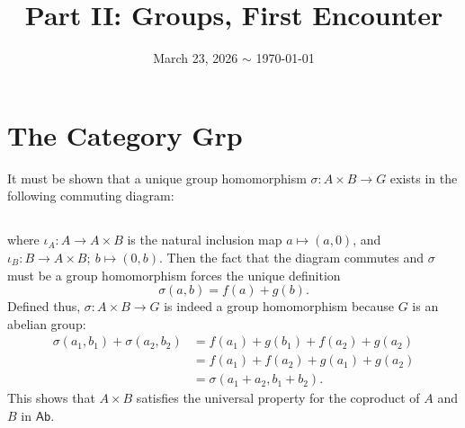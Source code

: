 \documentclass[12pt]{article}
\title{\course\ \\ Part II: Groups, First Encounter}
\author{\myname}
\date{March 23, 2026 $\sim$ \today}
\begin{document}
\maketitle
\thispagestyle{fancy}


\setcounter{section}{2}
\section{The Category Grp} 

\setcounter{subsection}{2} 
It must be shown that a unique group homomorphism $\sigma: A \times B \rightarrow G$ exists in the following commuting diagram: 
\subsection{} 
\begin{center}
\end{center}
where $\iota_{A}: A \rightarrow A \times B$ is the natural inclusion map $a \mapsto (a, 0)$, and $\iota_{B}: B \rightarrow A \times B; \: b \mapsto (0, b)$. 
Then the fact that the diagram commutes and $\sigma$ must be a group homomorphism forces the unique definition
$$\sigma(a, b) = f(a) + g(b).$$
Defined thus, $\sigma:A \times B \rightarrow G$ is indeed a group homomorphism because $G$ is an abelian group:
\begin{align*}
  \sigma(a_1, b_1) + \sigma(a_2, b_2) & = f(a_1) + g(b_1) + f(a_2) + g(a_2) \\ 
                                      & = f(a_1) + f(a_2) + g(a_1) + g(a_2) \\ 
                                      & = \sigma(a_1 + a_2, b_1 + b_2).
\end{align*}
This shows that $A \times B$ satisfies the universal property for the coproduct of $A$ and $B$ in $\mathsf{Ab}$. 

\setcounter{subsection}{4}
\subsection{} 
\end{document}

